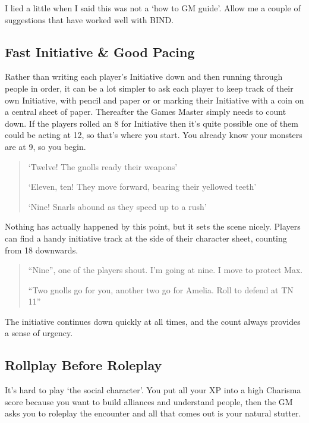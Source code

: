 \begin{multicols}{2}

I lied a little when I said this was not a `how to GM guide'.  Allow me a couple of suggestions that have worked well with BIND.

\subsection{Fast Initiative \& Good Pacing}

Rather than writing each player's Initiative down and then running through people in order, it can be a lot simpler to ask each player to keep track of their own Initiative, with pencil and paper or or marking their Initiative with a coin on a central sheet of paper. Thereafter the Games Master simply needs to count down. If the players rolled an 8 for Initiative then it's quite possible one of them could be acting at 12, so that's where you start. You already know your monsters are at 9, so you begin.

\begin{quote}
`Twelve! The gnolls ready their weapons'

`Eleven, ten! They move forward, bearing their yellowed teeth'

`Nine! Snarls abound as they speed up to a rush'
\end{quote}

Nothing has actually happened by this point, but it sets the scene nicely.  Players can find a handy initiative track at the side of their character sheet, counting from 18 downwards.

\begin{quote}
``Nine'', one of the players shout.  I'm going at nine.  I move to protect Max.

``Two gnolls go for you, another two go for Amelia.  Roll to defend at TN 11''

\end{quote}

The initiative continues down quickly at all times, and the count always provides a sense of urgency.

\subsection{Rollplay Before Roleplay}

It's hard to play `the social character'.  You put all your XP into a high Charisma score because you want to build alliances and understand people, then the GM asks you to roleplay the encounter and all that comes out is your natural stutter.


\end{multicols}
